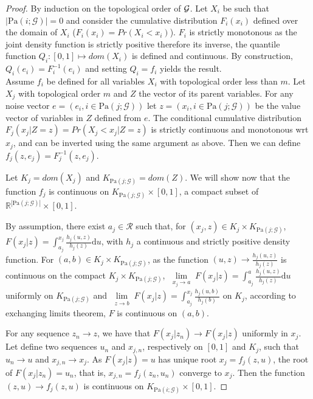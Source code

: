 \documentclass[a4paper, 11pt]{article}
\newcommand{\Pa}[1]{\text{Pa}({#1}; \mathcal{G})}
\begin{document}
\begin{proof}
By induction on the topological order of $\cal G$. Let $X_i$ be such that $|\Pa{i}|=0$ and consider the cumulative distribution $F_i(x_i)$ defined over the domain of $X_i$ ($F_i(x_i) = Pr(X_i < x_i)$). $F_i$ is strictly monotonous as the joint density function is strictly positive therefore its inverse, the quantile function $Q_i: [0,1] \mapsto dom(X_i)$ is defined and continuous. By construction, $Q_i(e_i) =F_i^{-1}(e_i)$ and setting $Q_i = f_i$ yields the result.\\
Assume $f_i$ be defined for all variables $X_i$ with topological order less than $m$.  Let $X_j$ with topological order $m$ and $Z$ the vector of its parent variables. For any noise vector $e = (e_i, i \in \Pa{j})$ let $z = (x_i,  i \in \Pa{j})$ be the value vector of variables in $Z$ defined from $e$. The conditional cumulative distribution $F_j(x_j | Z=z) = Pr(X_j < x_j | Z=z)$ is strictly continuous and monotonous wrt $x_j$, and can be inverted using the same argument as above. Then we can define $f_j(z,e_j) = F_j^{-1}(z,e_j)$.

Let $K_j = dom(X_j)$ and $K_{\Pa{j}} = dom(Z)$. We will show now that the function $f_j$ is continuous on $K_{\Pa{j}} \times [0,1]$, a compact subset of $\mathbb{R}^{|\Pa{j}|}\times [0,1]$.

By assumption, there exist $a_j \in \mathcal{R}$ such that, for $(x_j, z) \in K_j \times K_{\Pa{j}}$, $F(x_j|z) = \int_{a_j}^{x_j} \frac{h_j(u,z)}{h_j(z)} \mathrm{d}u$, with $h_j$ a continuous and strictly positive density function. For $(a,b) \in K_j \times K_{\Pa{j}}$, as the function $(u, z) \rightarrow \frac{h_j(u,z)}{h_j(z)}$ is continuous on the compact $K_j \times K_{\Pa{j}}$, $\lim\limits_{\substack{x_j \rightarrow a}} F(x_j|z) = \int_{a_j}^{a} \frac{h_j(u,z)}{h_j(z)} \mathrm{d}u$ uniformly on $K_{\Pa{j}}$ and $\lim\limits_{\substack{z \rightarrow b}} F(x_j|z) = \int_{a_j}^{x_j} \frac{h_j(u,b)}{h_j(b)}$ on $K_j$, according to exchanging limits theorem, $F$ is continuous on $(a,b)$. 
 
For any sequence $z_n \rightarrow z$, we have that $F(x_j|z_n) \rightarrow F(x_j|z)$ uniformly in $x_j$. Let define two sequences $u_n$ and $x_{j,n}$, respectively on $[0,1]$ and $K_j$, such that $u_n \rightarrow u$ and $x_{j,n} \rightarrow x_{j}$. As $F(x_j|z)=u$ has unique root $x_j = f_j(z,u)$, the root of $F(x_j|z_n)=u_n$, that is, $x_{j,n} = f_j(z_n,u_n)$ converge to $x_j$. Then the function $(z,u) \rightarrow f_j(z,u)$ is continuous on $K_{\Pa{i}} \times [0,1]$.
\end{proof}
\end{document}
